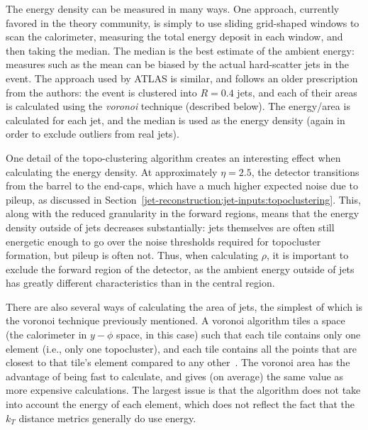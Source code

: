 The energy density can be measured in many ways. One approach, currently favored in the theory community, is simply to use sliding grid-shaped windows to scan the calorimeter, measuring the total energy deposit in each window, and then taking the median. The median is the best estimate of the ambient energy: measures such as the mean can be biased by the actual hard-scatter jets in the event. The approach used by ATLAS is similar, and follows an older prescription from the authors: the event is clustered into \kt $R=0.4$ jets, and each of their areas is calculated using the \textit{voronoi} technique (described below). The energy/area is calculated for each jet, and the median is used as the energy density (again in order to exclude outliers from real jets).

One detail of the topo-clustering algorithm creates an interesting effect when calculating the energy density. At approximately $\eta = 2.5$, the detector transitions from the barrel to the end-caps, which have a much higher expected noise due to pileup, as discussed in Section~\ref{jet-reconstruction:jet-inputs:topoclustering}. This, along with the reduced granularity in the forward regions, means that the energy density outside of jets decreases substantially: jets themselves are often still energetic enough to go over the noise thresholds required for topocluster formation, but pileup is often not. Thus, when calculating $\rho$, it is important to exclude the forward region of the detector, as the ambient energy outside of jets has greatly different characteristics than in the central region.

There are also several ways of calculating the area of jets, the simplest of which is the voronoi technique previously mentioned. A voronoi algorithm tiles a space (the calorimeter in $y-\phi$ space, in this case) such that each tile contains only one element (i.e., only one topocluster), and each tile contains all the points that are closest to that tile's element compared to any other~\cite{catchmentarea}. The voronoi area has the advantage of being fast to calculate, and gives (on average) the same value as more expensive calculations. The largest issue is that the algorithm does not take into account the energy of each element, which does not reflect the fact that the $k_T$ distance metrics generally do use energy.

